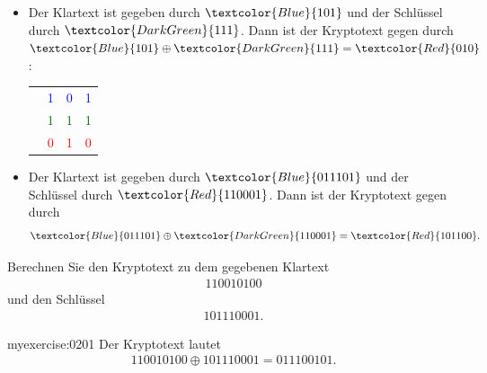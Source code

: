 \begin{myexample}
\begin{itemize}
	\item
	      Der Klartext ist gegeben durch $\textcolor{Blue}{101}$ und der Schlüssel durch $\textcolor{DarkGreen}{111}$. Dann ist der Kryptotext gegen durch
	      $\textcolor{Blue}{101} \oplus \textcolor{DarkGreen}{111} = \textcolor{Red}{010}$:
	      \begin{center}
		      \begin{tabular}{cccc}
			             & \textcolor{Blue}{1}      & \textcolor{Blue}{0}      & \textcolor{Blue}{1}      \\
			      \oplus & \textcolor{DarkGreen}{1} & \textcolor{DarkGreen}{1} & \textcolor{DarkGreen}{1} \\
			      \hline
			             & \textcolor{Red}{0}       & \textcolor{Red}{1}       & \textcolor{Red}{0}
		      \end{tabular}
	      \end{center}
	\item
	      Der Klartext ist gegeben durch $\textcolor{Blue}{011101}$ und der Schlüssel durch $\textcolor{Red}{110001}$. Dann ist der Kryptotext gegen durch
	      \begin{align*}
		      \textcolor{Blue}{011101} \oplus \textcolor{DarkGreen}{110001} = \textcolor{Red}{101100}.
	      \end{align*}
\end{itemize}
\end{myexample}

\begin{myexercise}
	Berechnen Sie den Kryptotext zu dem gegebenen Klartext
	\begin{align*}
		110010100
	\end{align*}
	und den Schlüssel
	\begin{align*}
		101110001.
	\end{align*}
	\begin{myanswer}{myexercise:0201}
		Der Kryptotext lautet
		\begin{align*}
			110010100 \oplus 101110001 = 011100101.
		\end{align*}
	\end{myanswer}
\end{myexercise}

